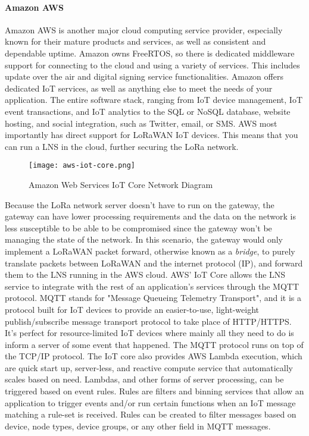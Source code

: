\paragraph{Amazon AWS}
Amazon AWS is another major cloud computing service provider, especially known
for their mature products and services, as well as consistent and dependable
uptime. Amazon owns FreeRTOS, so there is dedicated middleware support for
connecting to the cloud and using a variety of services. This includes update
over the air and digital signing service functionalities. Amazon offers
dedicated IoT services, as well as anything else to meet the needs of your
application. The entire software stack, ranging from IoT device management, IoT
event transactions, and IoT analytics to the SQL or NoSQL database, website
hosting, and social integration, such as Twitter, email, or SMS. AWS most
importantly has direct support for LoRaWAN IoT devices. This means that you can
run a LNS in the cloud, further securing the LoRa network. 

\begin{figure}
  \centering
  \texttt{[image: aws-iot-core.png]}
  \caption{Amazon Web Services IoT Core Network Diagram}
  \label{aws-iot-core}
\end{figure}

Because the LoRa network server doesn't have to run on the gateway, the gateway
can have lower processing requirements and the data on the network is  less
susceptible to be able to be compromised since the gateway won't be managing the
state of the network. In this scenario, the gateway would only implement a
LoRaWAN packet forward, otherwise known as a \emph{bridge}, to purely translate
packets between LoRaWAN and the internet protocol (IP), and forward them to the
LNS running in the AWS cloud. AWS' IoT Core allows the LNS service to integrate
with the rest of an application's services through the MQTT protocol. MQTT
stands for "Message Queueing Telemetry Transport", and it is a protocol built
for IoT devices to provide an easier-to-use, light-weight publish/subscribe
message transport protocol to take place of HTTP/HTTPS. It's perfect for
resource-limited IoT devices where mainly all they need to do is inform a server
of some event that happened. The MQTT protocol runs on top of the TCP/IP
protocol. The IoT core also provides AWS Lambda execution, which are quick start
up, server-less, and reactive compute service that automatically scales based on
need. Lambdas, and other forms of server processing, can be triggered based on
event rules. Rules are filters and binning services that allow an application to
trigger events and/or run certain functions when an IoT message matching a
rule-set is received. Rules can be created to filter messages based on device,
node types, device groups, or any other field in MQTT messages.


